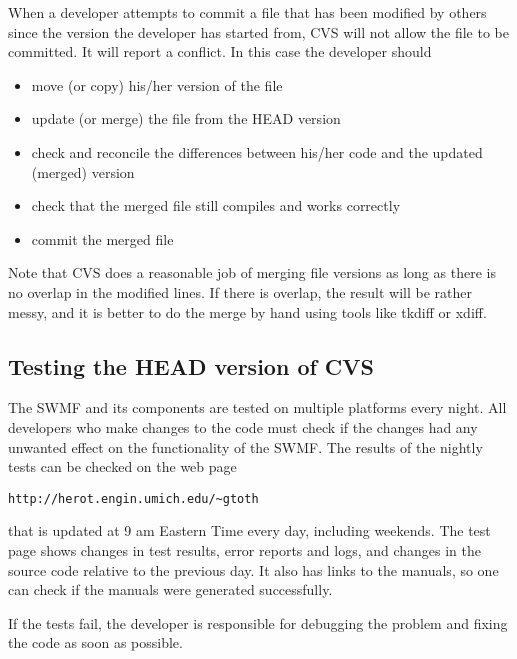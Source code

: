 \documentclass{article}
\begin{document}
When a developer attempts to commit a file that has been modified by others
since the version the developer has started from, CVS will not allow the file
to be committed. It will report a conflict. In this case the developer should 
\begin{itemize}
\item move (or copy) his/her version of the file
\item update (or merge) the file from the HEAD version
\item check and reconcile the differences between his/her code and 
      the updated (merged) version
\item check that the merged file still compiles and works correctly
\item commit the merged file
\end{itemize}
Note that CVS does a reasonable job of merging file versions as long as there
is no overlap in the modified lines. If there is overlap, the result will be
rather messy, and it is better to do the merge by hand using tools like 
tkdiff or xdiff.

\subsection{Testing the HEAD version of CVS}


The SWMF and its components are tested on multiple platforms every night.
All developers who make changes to the code must check if the changes had
any unwanted effect on the functionality of the SWMF. The results of the
nightly tests can be checked on the web page
\begin{verbatim}
http://herot.engin.umich.edu/~gtoth
\end{verbatim}
that is updated at 9 am Eastern Time every day, including weekends. The
test page shows changes in test results, error reports and logs, and 
changes in the source code relative to the previous day. It also has links
to the manuals, so one can check if the manuals were generated successfully.

If the tests fail, the developer is responsible for debugging the problem
and fixing the code as soon as possible. 
\end{document}
